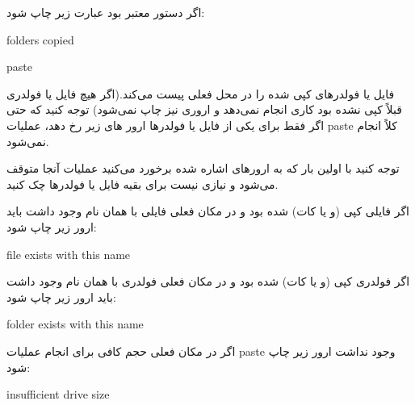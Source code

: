 \documentclass[]{article}
\begin{document}
اگر دستور معتبر بود عبارت زیر چاپ شود:

\begin{tcolorbox}[boxrule=0pt]
	\begin{latin}
  	  \large{
folders copied

		}
	\end{latin}
\end{tcolorbox}


\begin{tcolorbox}[boxrule=0pt]
	\begin{latin}
  	  \large{
paste

		}
	\end{latin}
\end{tcolorbox}


فایل یا فولدرهای کپی شده را در محل فعلی پیست می‌کند.(اگر هیچ فایل یا فولدری قبلاً کپی نشده بود کاری انجام نمی‌دهد و اروری نیز چاپ نمی‌شود) توجه کنید که حتی اگر فقط برای یکی از فایل یا فولدرها ارور های زیر رخ دهد، عملیات paste کلاً انجام نمی‌شود.

توجه کنید با اولین بار که به ارورهای اشاره شده برخورد می‌کنید عملیات آنجا متوقف می‌شود و نیازی نیست برای بقیه فایل یا فولدرها چک کنید.

اگر فایلی کپی (و یا کات) شده بود و در مکان فعلی فایلی با همان نام وجود داشت باید ارور 
زیر چاپ شود:


\begin{tcolorbox}[boxrule=0pt]
	\begin{latin}
  	  \large{
file exists with this name
		}
	\end{latin}
\end{tcolorbox}


اگر فولدری کپی (و یا کات) شده بود و در مکان فعلی فولدری با همان نام وجود داشت باید ارور 
زیر چاپ شود:


\begin{tcolorbox}[boxrule=0pt]
	\begin{latin}
  	  \large{
folder exists with this name
		}
	\end{latin}
\end{tcolorbox}



اگر در مکان فعلی حجم کافی برای انجام عملیات paste وجود نداشت ارور زیر چاپ شود:

\begin{tcolorbox}[boxrule=0pt]
	\begin{latin}
  	  \large{
 insufficient drive size
		}
	\end{latin}
\end{tcolorbox}
\end{document}
